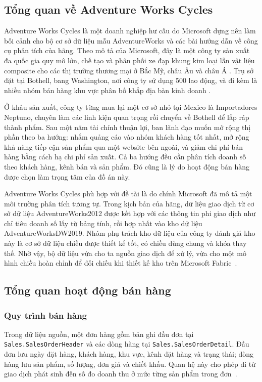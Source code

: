 
\subsection{Tổng quan về Adventure Works Cycles}

Adventure Works Cycles là một doanh nghiệp hư cấu do Microsoft dựng nên làm bối cảnh cho bộ cơ sở dữ liệu mẫu AdventureWorks và các bài hướng dẫn về công cụ phân tích của hãng. Theo mô tả của Microsoft, đây là một công ty sản xuất đa quốc gia quy mô lớn, chế tạo và phân phối xe đạp khung kim loại lẫn vật liệu composite cho các thị trường thương mại ở Bắc Mỹ, châu Âu và châu Á \citep{microsoft-scenario}. Trụ sở đặt tại Bothell, bang Washington, nơi công ty sử dụng 500 lao động, và đi kèm là nhiều nhóm bán hàng khu vực phân bố khắp địa bàn kinh doanh \citep{microsoft-scenario}.

Ở khâu sản xuất, công ty từng mua lại một cơ sở nhỏ tại Mexico là Importadores Neptuno, chuyên làm các linh kiện quan trọng rồi chuyển về Bothell để lắp ráp thành phẩm. Sau một năm tài chính thuận lợi, ban lãnh đạo muốn mở rộng thị phần theo ba hướng: nhắm quảng cáo vào nhóm khách hàng tốt nhất, mở rộng khả năng tiếp cận sản phẩm qua một website bên ngoài, và giảm chi phí bán hàng bằng cách hạ chi phí sản xuất. Cả ba hướng đều cần phân tích doanh số theo khách hàng, kênh bán và sản phẩm. Đó cũng là lý do hoạt động bán hàng được chọn làm trọng tâm của đồ án này.

Adventure Works Cycles phù hợp với đề tài là do chính Microsoft đã mô tả một môi trường phân tích tương tự. Trong kịch bản của hãng, dữ liệu giao dịch từ cơ sở dữ liệu AdventureWorks2012 được kết hợp với các thông tin phi giao dịch như chỉ tiêu doanh số lấy từ bảng tính, rồi hợp nhất vào kho dữ liệu AdventureWorksDW2019. Nhóm phụ trách kho dữ liệu của công ty đánh giá kho này là cơ sở dữ liệu chiều được thiết kế tốt, có chiều dùng chung và khóa thay thế. Nhờ vậy, bộ dữ liệu vừa cho ta nguồn giao dịch để xử lý, vừa cho một mô hình chiều hoàn chỉnh để đối chiếu khi thiết kế kho trên Microsoft Fabric~\citep{microsoft-scenario}.

\subsection{Tổng quan hoạt động bán hàng}
\subsubsection{Quy trình bán hàng}
Trong dữ liệu nguồn, một đơn hàng gồm bản ghi đầu đơn tại \texttt{Sales.\allowbreak SalesOrderHeader} và các dòng hàng tại \texttt{Sales.\allowbreak SalesOrderDetail}. Đầu đơn lưu ngày đặt hàng, khách hàng, khu vực, kênh đặt hàng và trạng thái; dòng hàng lưu sản phẩm, số lượng, đơn giá và chiết khấu. Quan hệ này cho phép đi từ giao dịch phát sinh đến số đo doanh thu ở mức từng sản phẩm trong đơn~\citep{aw-samples}.
